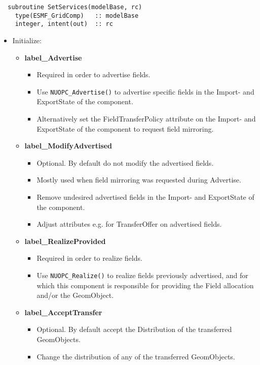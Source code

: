 \begin{verbatim}  subroutine SetServices(modelBase, rc)
    type(ESMF_GridComp)   :: modelBase
    integer, intent(out)  :: rc
\end{verbatim}

\begin{itemize}
  \item Initialize:
  \begin{itemize}
    \item {\bf label\_Advertise}
    \begin{itemize}
      \item Required in order to advertise fields.
      \item Use {\tt NUOPC\_Advertise()} to advertise specific fields in the Import- and ExportState of the component.
      \item Alternatively set the FieldTransferPolicy attribute on the Import- and ExportState of the component to request field mirroring.
    \end{itemize}
    \item {\bf label\_ModifyAdvertised}
    \begin{itemize}
      \item Optional. By default do not modify the advertised fields.
      \item Mostly used when field mirroring was requested during Advertise.
      \item Remove undesired advertised fields in the Import- and ExportState of the component.
      \item Adjust attributes e.g. for TransferOffer on advertised fields.
    \end{itemize}
    \item {\bf label\_RealizeProvided}
    \begin{itemize}
      \item Required in order to realize fields.
      \item Use {\tt NUOPC\_Realize()} to realize fields previously advertised, and for which this component is responsible for providing the Field allocation and/or the GeomObject.
    \end{itemize}
    \item {\bf label\_AcceptTransfer}
    \begin{itemize}
      \item Optional. By default accept the Distribution of the transferred GeomObjects.
      \item Change the distribution of any of the transferred GeomObjects.

\end{itemize}
\end{itemize}
\end{itemize}
